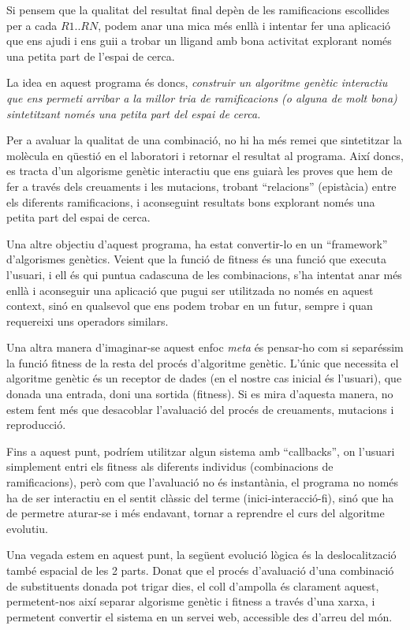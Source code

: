 	Si pensem que la qualitat del resultat final depèn de les
	ramificacions escollides per a cada $R1..RN$, podem anar una mica més enllà i
	intentar fer una aplicació que ens ajudi i ens guii a trobar un lligand amb
	bona activitat explorant només una petita part de l'espai de cerca.
	
	La idea en aquest programa és doncs, \emph{construir un algoritme genètic
	interactiu que ens permeti arribar a la millor tria de ramificacions (o
	alguna de molt bona) sintetitzant només una petita part del espai de
	cerca.}

	Per a avaluar la qualitat de una combinació, no hi ha més remei que
	sintetitzar la molècula en qüestió en el laboratori i retornar el resultat
	al programa.  Així doncs, es tracta d'un algorisme genètic interactiu que
	ens guiarà les proves que hem de fer a través dels creuaments i les
	mutacions, trobant ``relacions'' (epistàcia) entre els diferents
	ramificacions, i aconseguint resultats bons explorant només una petita part
	del espai de cerca.

	Una altre objectiu d'aquest programa, ha estat convertir-lo en un
	``framework'' d'algorismes genètics.  Veient que la funció de fitness és una
	funció que executa l'usuari, i ell és qui puntua cadascuna de les
	combinacions, s'ha intentat anar més enllà i aconseguir una aplicació que
	pugui ser utilitzada no només en aquest context, sinó en qualsevol que ens
	podem trobar en un futur, sempre i quan requereixi uns operadors similars.

	Una altra manera d'imaginar-se aquest enfoc \emph{meta} és pensar-ho com si
	separéssim la funció fitness de la resta del procés d'algoritme genètic.
	L'únic que necessita el algoritme genètic és un receptor de dades (en el
	nostre cas inicial és l'usuari), que donada una entrada, doni una
	sortida (fitness).  Si es mira d'aquesta manera, no estem fent més que
	desacoblar l'avaluació del procés de creuaments, mutacions i reproducció.

	Fins a aquest punt, podríem utilitzar algun sistema amb ``callbacks'', on
	l'usuari simplement entri els fitness als diferents individus (combinacions
	de ramificacions), però com que l'avaluació no és instantània, el programa no
	només ha de ser interactiu en el sentit clàssic del terme (inici-interacció-fi),
	sinó que ha de permetre aturar-se i més endavant, tornar a reprendre el curs
	del algoritme evolutiu. 

	Una vegada estem en aquest punt, la següent evolució lògica és la
	deslocalització també espacial de les 2 parts.  Donat que el procés
	d'avaluació d'una combinació de substituents donada pot trigar dies, el coll
	d'ampolla és clarament aquest, permetent-nos així separar algorisme
	genètic i fitness a través d'una xarxa, i permetent convertir el sistema en
	un servei web, accessible des d'arreu del món.

